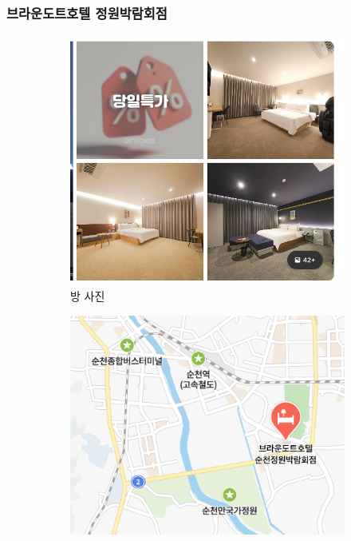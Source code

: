 \documentclass[10pt]{article}
\begin{document}
\subsubsection{브라운도트호텔 정원박람회점}
\begin{figure}[htbp]
  \centering
  \begin{subfigure}{0.3\textwidth}
    \centering
    \includegraphics[width=\linewidth]{fig/4_방.png}
    \caption{방 사진}
    \label{fig:1}
  \end{subfigure}
  \hfill
  \begin{subfigure}{0.3\textwidth}
    \centering
    \includegraphics[width=\linewidth]{fig/4_위치.png}

\end{subfigure}
\end{figure}
\end{document}
